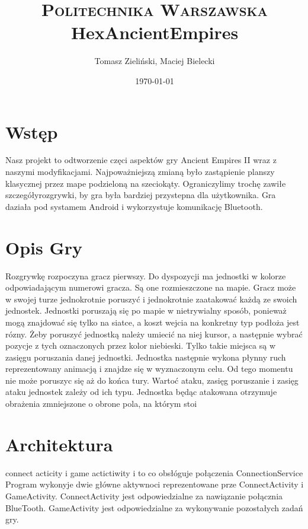 \documentclass[paper=a4, fontsize=11pt]{scrartcl} %
\title{	
\normalfont \normalsize 
\textsc{Politechnika Warszawska} \\ [25pt] %
\huge HexAncientEmpires \\ %
}
\author{Tomasz Zieliński,  Maciej Bielecki}
\date{\normalsize\today}
\numberwithin{equation}{section} %
\numberwithin{figure}{section} %
\numberwithin{table}{section} %
\begin{document}
\maketitle 

\section{Wstęp}
Nasz projekt to odtworzenie częci aspektów gry Ancient Empires II wraz z naszymi modyfikacjami. Najpoważniejszą zmianą było zastąpienie planszy klasycznej przez mape podzieloną na szeciokąty. Ograniczylimy trochę zawiłe szczegółyrozgrywki, by gra była bardziej przystepna dla użytkownika. Gra daziała pod systamem Android i wykorzystuje komunikację Bluetooth. 

\section{Opis Gry}
Rozgrywkę rozpoczyna gracz pierwszy. Do dyspozycji ma jednostki w kolorze odpowiadającym numerowi gracza. Są one rozmieszczone na mapie.
Gracz może w swojej turze jednokrotnie poruszyć i jednokrotnie zaatakować każdą ze swoich jednostek. Jednostki poruszają się po mapie w nietrywialny sposób, ponieważ mogą znajdować się tylko na siatce, a koszt wejcia na konkretny typ podłoża jest rózny. Żeby poruszyć jednostką należy umiecić na niej kursor, a następnie wybrać pozycje z tych oznaczonych przez kolor niebieski. Tylko takie miejsca są w zasięgu poruszania danej jednostki. Jednostka następnie wykona płynny ruch reprezentowany animacją i znajdze się w wyznaczonym celu. Od tego momentu nie może poruszyc się aż do końca tury.  Wartoć ataku, zasięg poruszanie i zasięg ataku jednostek zależy od ich typu. Jednostka będąc atakowana otrzymuje obrażenia zmniejszone o obrone pola, na którym stoi

\section{Architektura}
connect acticity i game actictiwity  i to co obsłóguje połączenia ConnectionService
Program wykonyje dwie główne aktywnoci reprezentowane prze ConnectActivity i GameActivity. ConnectActivity jest odpowiedzialne za nawiązanie połącznia BlueTooth. GameActivity jest odpowiedzialne za wykonywanie pozostałych zadań gry.
\end{document}
